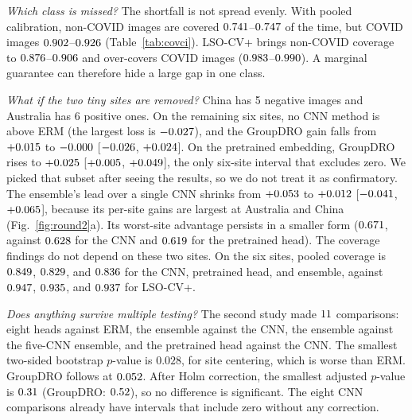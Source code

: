\documentclass[journal]{IEEEtran}
\newcommand{\erm}{ERM}
\newcommand{\tabnote}[1]{\par\vspace{3pt}{\footnotesize\raggedright #1\par}}
\newcommand{\tabin}[1]{}
\begin{document}
\emph{Which class is missed?} The shortfall is not spread evenly. With pooled calibration, non-COVID images are covered $0.741$--$0.747$ of the time, but COVID images $0.902$--$0.926$ (Table~\ref{tab:covci}). LSO-CV+ brings non-COVID coverage to $0.876$--$0.906$ and over-covers COVID images ($0.983$--$0.990$). A marginal guarantee can therefore hide a large gap in one class.
\begin{table}[!t]\centering\footnotesize\setlength{\tabcolsep}{1.5pt}
\caption{Conformal Coverage With Bootstrap Intervals}\label{tab:covci}
\tabin{r2_coverage_ci.tex}
\tabnote{Mean over eight held-out sites at $\alpha=0.1$ with a hierarchical bootstrap 95\% interval (3000 replicates, seeds averaged), and mean coverage within each class (over sites with at least five images of the class). Pooled calibration uses the seen-site validation data.}
\end{table}

\emph{What if the two tiny sites are removed?} China has 5 negative images and Australia has 6 positive ones. On the remaining six sites, no CNN method is above \erm{} (the largest loss is $-0.027$), and the GroupDRO gain falls from $+0.015$ to $-0.000$ [$-0.026$, $+0.024$]. On the pretrained embedding, GroupDRO rises to $+0.025$ [$+0.005$, $+0.049$], the only six-site interval that excludes zero. We picked that subset after seeing the results, so we do not treat it as confirmatory. The ensemble's lead over a single CNN shrinks from $+0.053$ to $+0.012$ [$-0.041$, $+0.065$], because its per-site gains are largest at Australia and China (Fig.~\ref{fig:round2}a). Its worst-site advantage persists in a smaller form ($0.671$, against $0.628$ for the CNN and $0.619$ for the pretrained head). The coverage findings do not depend on these two sites. On the six sites, pooled coverage is $0.849$, $0.829$, and $0.836$ for the CNN, pretrained head, and ensemble, against $0.947$, $0.935$, and $0.937$ for LSO-CV+.

\emph{Does anything survive multiple testing?} The second study made $11$ comparisons: eight heads against \erm{}, the ensemble against the CNN, the ensemble against the five-CNN ensemble, and the pretrained head against the CNN. The smallest two-sided bootstrap $p$-value is $0.028$, for site centering, which is worse than \erm{}. GroupDRO follows at $0.052$. After Holm correction, the smallest adjusted $p$-value is $0.31$ (GroupDRO: $0.52$), so no difference is significant. The eight CNN comparisons already have intervals that include zero without any correction.
\end{document}
